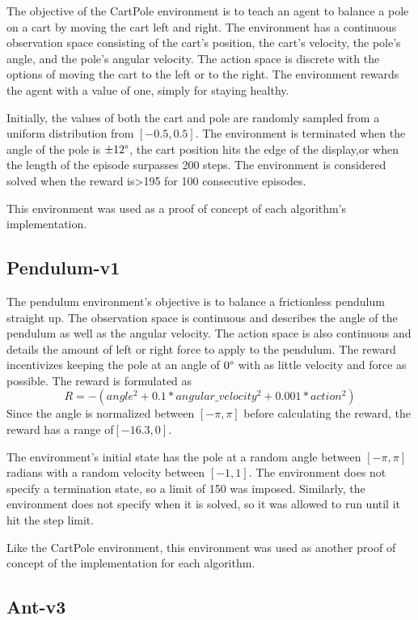 \documentclass[conference]{IEEEtran}
\begin{document}
The objective of the CartPole environment is to teach an agent to balance a pole on a cart by moving the cart left and right. The environment has a continuous observation space consisting of the cart's position, the cart's velocity, the pole's angle, and the pole's angular velocity. The action space is discrete with the options of moving the cart to the left or to the right. The environment rewards the agent with a value of one, simply for staying healthy.

Initially, the values of both the cart and pole are randomly sampled from a uniform distribution from $[-0.5, 0.5]$. The environment is terminated when the angle of the pole is $\pm12\degree$, the cart position hits the edge of the display,or when the length of the episode surpasses 200 steps. The environment is considered solved when the reward is\textgreater 195 for 100 consecutive episodes.

This environment was used as a proof of concept of each algorithm's implementation.

\subsection{Pendulum-v1}

The pendulum environment's objective is to balance a frictionless pendulum straight up. The observation space is continuous and describes the angle of the pendulum as well as the angular velocity. The action space is also continuous and details the amount of left or right force to apply to the pendulum. The reward incentivizes keeping the pole at an angle of $0\degree$ with as little velocity and force as possible. The reward is formulated as
$$
    R = -(angle ^{2} + 0.1 * angular\_velocity ^ {2} + 0.001 * action ^ {2})
$$
Since the angle is normalized between $[-\pi, \pi]$ before calculating the reward, the reward has a range of$[-16.3, 0]$.

The environment's initial state has the pole at a random angle between $[-\pi, \pi]$ radians with a random velocity between $[-1, 1]$. The environment does not specify a termination state, so a limit of 150 was imposed. Similarly, the environment does not specify when it is solved, so it was allowed to run until it hit the step limit.

Like the CartPole environment, this environment was used as another proof of concept of the implementation for each algorithm.

\subsection{Ant-v3}
\end{document}
